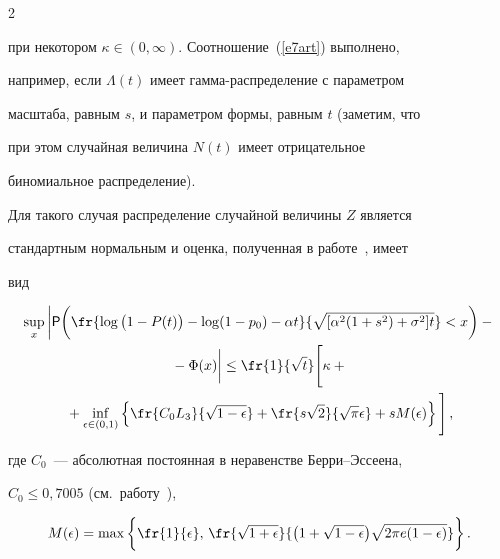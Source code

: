 \begin{multicols}{2}
\begin{equation}
\end{equation}


при некотором $\kappa\in(0,\infty)$. Соотношение~(\ref{e7art}) выполнено,


например, если $\Lambda(t)$ имеет гамма-рас\-пре\-де\-ление с параметром


масштаба, равным $s$, и параметром формы, равным $t$ (заметим, что


при этом случайная величина $N(t)$ имеет отрицательное


биномиальное распределение).





Для такого случая распределение случайной величины $Z$ является


стандартным нормальным и оценка, полученная в работе~\cite{10art}, имеет


вид


\begin{multline}


\sup_x\bigg|{\sf P}\bigg(\fr{\log \big(1-P(t)\big)-\log


(1-p_0)-\alpha


t}{\sqrt{[\alpha^2(1+s^2)+\sigma^2]t}}<x\bigg)-{}\\


{}- \Phi(x)\bigg|\le\fr{1}{\sqrt{t}}\Bigg[


\kappa+{}\\


{}+\inf_{\epsilon\in(0,1)}\left\{\fr{C_0L_3}{\sqrt{1-\epsilon}}+


\fr{s\sqrt{2}}{\sqrt{\pi}\epsilon}+sM(\epsilon)\right\}\Bigg]\,,


\label{e8art}


\end{multline}


где $C_0$~--- абсолютная постоянная в неравенстве Берри--Эссеена,


$C_0\le 0{,}7005$ (см.\ работу~\cite{11art}),


$$


M(\epsilon)=\max\bigg\{\fr{1}{\epsilon},\,\fr{\sqrt{1+\epsilon}}{\big(1+\sqrt{1-\epsilon}\big)\sqrt{2\pi


e(1-\epsilon)}}\bigg\}\,.


$$





\smallskip






\end{multicols}
